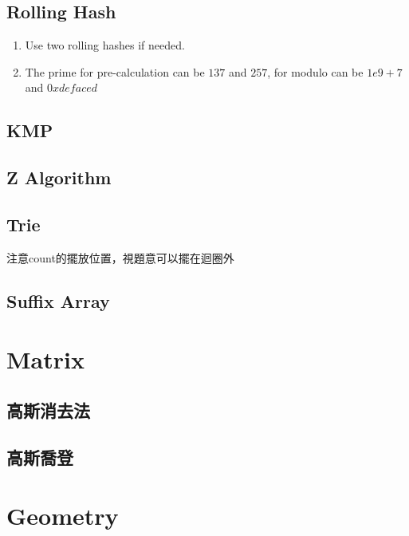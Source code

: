 \documentclass[10pt,oneside]{article}
\begin{document}
\begin{landscape}
\begin{multicols}{2}
\subsection{Rolling Hash}

\begin{enumerate}
	\item Use two rolling hashes if needed.  
	\item The prime for pre-calculation can be $137$ and $257$, for modulo can be $1e9 + 7$ and $0xdefaced$ 
\end{enumerate}



\subsection{KMP}



\subsection{Z Algorithm}

\subsection{Trie}

注意count的擺放位置，視題意可以擺在迴圈外



\subsection{Suffix Array}

\section{Matrix}

\subsection{高斯消去法}

\subsection{高斯喬登}


\section{Geometry}


\end{multicols}
\end{landscape}
\end{document}
